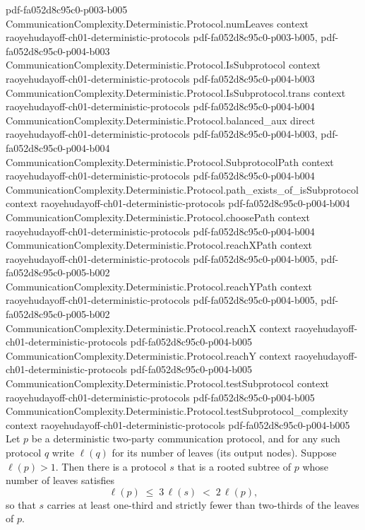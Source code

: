 \begin{theorem}
  {pdf-fa052d8c95c0-p003-b005}
\proofstep
  {CommunicationComplexity.Deterministic.Protocol.numLeaves}
  {context}
  {raoyehudayoff-ch01-deterministic-protocols}
  {pdf-fa052d8c95c0-p003-b005,
    pdf-fa052d8c95c0-p004-b003}
\proofstep
  {CommunicationComplexity.Deterministic.Protocol.IsSubprotocol}
  {context}
  {raoyehudayoff-ch01-deterministic-protocols}
  {pdf-fa052d8c95c0-p004-b003}
\proofstep
  {CommunicationComplexity.Deterministic.Protocol.IsSubprotocol.trans}
  {context}
  {raoyehudayoff-ch01-deterministic-protocols}
  {pdf-fa052d8c95c0-p004-b004}
\proofstep
  {CommunicationComplexity.Deterministic.Protocol.balanced_aux}
  {direct}
  {raoyehudayoff-ch01-deterministic-protocols}
  {pdf-fa052d8c95c0-p004-b003,
    pdf-fa052d8c95c0-p004-b004}
\proofstep
  {CommunicationComplexity.Deterministic.Protocol.SubprotocolPath}
  {context}
  {raoyehudayoff-ch01-deterministic-protocols}
  {pdf-fa052d8c95c0-p004-b004}
\proofstep
  {CommunicationComplexity.Deterministic.Protocol.path_exists_of_isSubprotocol}
  {context}
  {raoyehudayoff-ch01-deterministic-protocols}
  {pdf-fa052d8c95c0-p004-b004}
\proofstep
  {CommunicationComplexity.Deterministic.Protocol.choosePath}
  {context}
  {raoyehudayoff-ch01-deterministic-protocols}
  {pdf-fa052d8c95c0-p004-b004}
\proofstep
  {CommunicationComplexity.Deterministic.Protocol.reachXPath}
  {context}
  {raoyehudayoff-ch01-deterministic-protocols}
  {pdf-fa052d8c95c0-p004-b005,
    pdf-fa052d8c95c0-p005-b002}
\proofstep
  {CommunicationComplexity.Deterministic.Protocol.reachYPath}
  {context}
  {raoyehudayoff-ch01-deterministic-protocols}
  {pdf-fa052d8c95c0-p004-b005,
    pdf-fa052d8c95c0-p005-b002}
\proofstep
  {CommunicationComplexity.Deterministic.Protocol.reachX}
  {context}
  {raoyehudayoff-ch01-deterministic-protocols}
  {pdf-fa052d8c95c0-p004-b005}
\proofstep
  {CommunicationComplexity.Deterministic.Protocol.reachY}
  {context}
  {raoyehudayoff-ch01-deterministic-protocols}
  {pdf-fa052d8c95c0-p004-b005}
\proofstep
  {CommunicationComplexity.Deterministic.Protocol.testSubprotocol}
  {context}
  {raoyehudayoff-ch01-deterministic-protocols}
  {pdf-fa052d8c95c0-p004-b005}
\proofstep
  {CommunicationComplexity.Deterministic.Protocol.testSubprotocol_complexity}
  {context}
  {raoyehudayoff-ch01-deterministic-protocols}
  {pdf-fa052d8c95c0-p004-b005}
Let $p$ be a deterministic two-party communication protocol, and for any such protocol
$q$ write $\ell(q)$ for its number of leaves (its output nodes). Suppose $\ell(p) > 1$.
Then there is a protocol $s$ that is a rooted subtree of $p$ whose number of leaves
satisfies
\[
  \ell(p) \;\le\; 3\,\ell(s) \;<\; 2\,\ell(p),
\]
so that $s$ carries at least one-third and strictly fewer than two-thirds of the leaves
of $p$.
\end{theorem}

